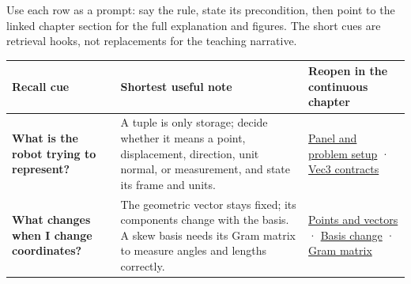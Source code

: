 Use each row as a prompt: say the rule, state its precondition, then point to the linked chapter section for the full explanation and figures. The short cues are retrieval hooks, not replacements for the teaching narrative.

{\def\LTcaptype{none} %
\begin{longtable}[]{@{}
  >{\raggedright\arraybackslash}p{}
  >{\raggedright\arraybackslash}p{}
  >{\raggedright\arraybackslash}p{}@{}}
\toprule\noalign{}
\begin{minipage}[b]{\linewidth}\raggedright
Recall cue
\end{minipage} & \begin{minipage}[b]{\linewidth}\raggedright
Shortest useful note
\end{minipage} & \begin{minipage}[b]{\linewidth}\raggedright
Reopen in the continuous chapter
\end{minipage} \\
\midrule\noalign{}
\endhead
\bottomrule\noalign{}
\endlastfoot
\textbf{What is the robot trying to represent?} & A tuple is only storage; decide whether it means a point, displacement, direction, unit normal, or measurement, and state its frame and units. & \href{Continuous\%20Notes/Computing\%20Foundations\%20-\%20From\%20Bits\%20to\%20C++\%20and\%20Systems\%20APIs\#The\%20panel\%20gives\%20us\%20a\%20reason\%20to\%20learn/}{Panel and problem setup} · \href{Continuous\%20Notes/Computing\%20Foundations\%20-\%20From\%20Bits\%20to\%20C++\%20and\%20Systems\%20APIs\#Three\%20stored\%20numbers\%20are\%20not\%20the\%20complete\%20contract/}{Vec3 contracts} \\
\textbf{What changes when I change coordinates?} & The geometric vector stays fixed; its components change with the basis. A skew basis needs its Gram matrix to measure angles and lengths correctly. & \href{Continuous\%20Notes/Computing\%20Foundations\%20-\%20From\%20Bits\%20to\%20C++\%20and\%20Systems\%20APIs\#An\%20arrow\%20is\%20not\%20the\%20address\%20written\%20beside\%20it/}{Points and vectors} · \href{Continuous\%20Notes/Computing\%20Foundations\%20-\%20From\%20Bits\%20to\%20C++\%20and\%20Systems\%20APIs\#A\%20basis\%20is\%20a\%20measuring\%20arrangement,\%20not\%20the\%20vector\%20itself/}{Basis change} · \href{Continuous\%20Notes/Computing\%20Foundations\%20-\%20From\%20Bits\%20to\%20C++\%20and\%20Systems\%20APIs\#A\%20Gram\%20matrix\%20remembers\%20the\%20geometry\%20of\%20a\%20slanted\%20basis/}{Gram matrix} \\

\end{longtable}}
